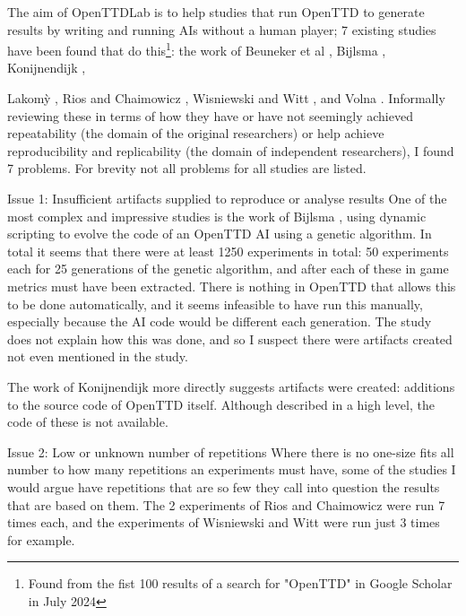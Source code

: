 \documentclass[logo,msc,dsti]{style/infthesis}    %
\newcommand{\singlespacedfootnote}[1]{{\singlespace\footnote{#1}}}
\begin{document}
The aim of OpenTTDLab is to help studies that run OpenTTD to generate results by writing and running AIs without a human player; 7 existing studies have been found that do this\singlespacedfootnote{Found from the fist 100 results of a search for "OpenTTD" in Google Scholar in July 2024}: the work of Beuneker et al \cite{beuneker2019autonomous}, Bijlsma \cite{bijlsma2014evolving}, Konijnendijk \cite{konijnendijk2015mcts}, {Lakom{\`y} \cite{lakomy2020railroad}, Rios and Chaimowicz \cite{rios2009trains}, Wisniewski and Witt \cite{wisniewski2011artificial}, and Volna \cite{volna2017fuzzy}. Informally reviewing these in terms of how they have or have not seemingly achieved repeatability (the domain of the original researchers) or help achieve reproducibility and replicability (the domain of independent researchers), I found 7 problems. For brevity not all problems for all studies are listed.

\begin{itemize}

\begin{descitem}{Issue 1: Insufficient artifacts supplied to reproduce or analyse results}
One of the most complex and impressive studies is the work of Bijlsma \cite{bijlsma2014evolving}, using dynamic scripting to evolve the code of an OpenTTD AI using a genetic algorithm. In total it seems that there were at least 1250 experiments in total: 50 experiments each for 25 generations of the genetic algorithm, and after each of these in game metrics must have been extracted. There is nothing in OpenTTD that allows this to be done automatically, and it seems infeasible to have run this manually, especially because the AI code would be different each generation. The study does not explain how this was done, and so I suspect there were artifacts created not even mentioned in the study.

The work of Konijnendijk \cite{konijnendijk2015mcts} more directly suggests artifacts were created: additions to the source code of OpenTTD itself. Although described in a high level, the code of these is not available.
\end{descitem}

\begin{descitem}{Issue 2: Low or unknown number of repetitions}
Where there is no one-size fits all number to how many repetitions an experiments must have, some of the studies I would argue have repetitions that are so few they call into question the results that are based on them. The 2 experiments of Rios and Chaimowicz \cite{rios2009trains} were run 7 times each, and the experiments of Wisniewski and Witt \cite{wisniewski2011artificial} were run just 3 times for example.


\end{descitem}
\end{itemize}}
\end{document}
